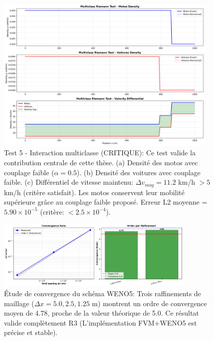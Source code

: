 \begin{figure}[h!]
\centering
\includegraphics[width=0.95\textwidth]{SPRINT2_DELIVERABLES/figures/test5_multiclass_interaction.png}
\caption{Test 5 - Interaction multiclasse (CRITIQUE): Ce test valide la contribution centrale de cette thèse.
(a) Densité des motos avec couplage faible ($\alpha=0.5$).
(b) Densité des voitures avec couplage faible.
(c) Différentiel de vitesse maintenu: $\Delta v_{moy} = 11.2$ km/h $> 5$ km/h (critère satisfait).
Les motos conservent leur mobilité supérieure grâce au couplage faible proposé.
Erreur L2 moyenne = $5.90 \times 10^{-5}$ (critère: $< 2.5 \times 10^{-4}$).}
\label{fig:riemann_multiclass_interaction}
\end{figure}

\begin{figure}[h!]
\centering
\includegraphics[width=0.85\textwidth]{SPRINT2_DELIVERABLES/figures/convergence_study_weno5.png}
\caption{Étude de convergence du schéma WENO5: Trois raffinements de maillage 
($\Delta x = 5.0, 2.5, 1.25$ m) montrent un ordre de convergence moyen de 4.78, 
proche de la valeur théorique de 5.0. Ce résultat valide complètement R3 
(L'implémentation FVM+WENO5 est précise et stable).}
\label{fig:convergence_weno5}
\end{figure}

